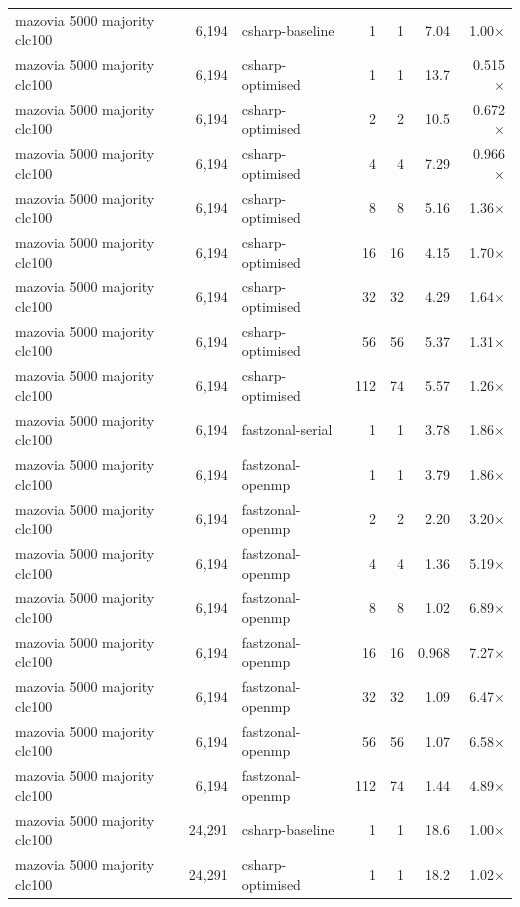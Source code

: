 \begin{tabular}{lrlrrrr}
mazovia 5000 majority clc100 & 6,194 & csharp-baseline & 1 & 1 & 7.04 & 1.00$\times$ \\
mazovia 5000 majority clc100 & 6,194 & csharp-optimised & 1 & 1 & 13.7 & 0.515$\times$ \\
mazovia 5000 majority clc100 & 6,194 & csharp-optimised & 2 & 2 & 10.5 & 0.672$\times$ \\
mazovia 5000 majority clc100 & 6,194 & csharp-optimised & 4 & 4 & 7.29 & 0.966$\times$ \\
mazovia 5000 majority clc100 & 6,194 & csharp-optimised & 8 & 8 & 5.16 & 1.36$\times$ \\
mazovia 5000 majority clc100 & 6,194 & csharp-optimised & 16 & 16 & 4.15 & 1.70$\times$ \\
mazovia 5000 majority clc100 & 6,194 & csharp-optimised & 32 & 32 & 4.29 & 1.64$\times$ \\
mazovia 5000 majority clc100 & 6,194 & csharp-optimised & 56 & 56 & 5.37 & 1.31$\times$ \\
mazovia 5000 majority clc100 & 6,194 & csharp-optimised & 112 & 74 & 5.57 & 1.26$\times$ \\
mazovia 5000 majority clc100 & 6,194 & fastzonal-serial & 1 & 1 & 3.78 & 1.86$\times$ \\
mazovia 5000 majority clc100 & 6,194 & fastzonal-openmp & 1 & 1 & 3.79 & 1.86$\times$ \\
mazovia 5000 majority clc100 & 6,194 & fastzonal-openmp & 2 & 2 & 2.20 & 3.20$\times$ \\
mazovia 5000 majority clc100 & 6,194 & fastzonal-openmp & 4 & 4 & 1.36 & 5.19$\times$ \\
mazovia 5000 majority clc100 & 6,194 & fastzonal-openmp & 8 & 8 & 1.02 & 6.89$\times$ \\
mazovia 5000 majority clc100 & 6,194 & fastzonal-openmp & 16 & 16 & 0.968 & 7.27$\times$ \\
mazovia 5000 majority clc100 & 6,194 & fastzonal-openmp & 32 & 32 & 1.09 & 6.47$\times$ \\
mazovia 5000 majority clc100 & 6,194 & fastzonal-openmp & 56 & 56 & 1.07 & 6.58$\times$ \\
mazovia 5000 majority clc100 & 6,194 & fastzonal-openmp & 112 & 74 & 1.44 & 4.89$\times$ \\
mazovia 5000 majority clc100 & 24,291 & csharp-baseline & 1 & 1 & 18.6 & 1.00$\times$ \\
mazovia 5000 majority clc100 & 24,291 & csharp-optimised & 1 & 1 & 18.2 & 1.02$\times$ \\

\end{tabular}
